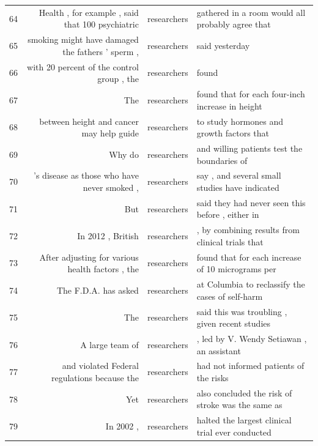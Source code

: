 {\begin{table}
\begin{tabular}{lrrl}
64 & Health , for example , said that 100 psychiatric   & researchers & gathered in a room would all probably agree that   \\
65 & smoking might have damaged the fathers ' sperm ,   & researchers & said yesterday                                     \\
66 & with 20 percent of the control group , the         & researchers & found                                              \\
67 & The                                                & researchers & found that for each four-inch increase in height   \\
68 & between height and cancer may help guide           & researchers & to study hormones and growth factors that          \\
69 & Why do                                             & researchers & and willing patients test the boundaries of        \\
70 & 's disease as those who have never smoked ,        & researchers & say , and several small studies have indicated     \\
71 & But                                                & researchers & said they had never seen this before , either in   \\
72 & In 2012 , British                                  & researchers & , by combining results from clinical trials that   \\
73 & After adjusting for various health factors , the   & researchers & found that for each increase of 10 micrograms per  \\
74 & The F.D.A. has asked                               & researchers & at Columbia to reclassify the cases of self-harm   \\
75 & The                                                & researchers & said this was troubling , given recent studies     \\
76 &  A large team of                                    & researchers & , led by V. Wendy Setiawan , an assistant          \\
77 &  and violated Federal regulations because the       & researchers & had not informed patients of the risks             \\
78 &  Yet                                                & researchers & also concluded the risk of stroke was the same as  \\
79 &  In 2002 ,                                          & researchers & halted the largest clinical trial ever conducted   \\

\end{tabular}
\end{table}}
